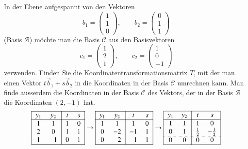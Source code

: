 \begin{beispiel}
In der Ebene aufgespannt von den Vektoren
\[
b_1=\begin{pmatrix}1\\1\\0 \end{pmatrix}
,\qquad
b_2=\begin{pmatrix}0\\1\\1 \end{pmatrix}
\]
(Basis $\mathcal{B}$)
möchte man die Basis $\mathcal{C}$ aus den Basisvektoren
\[
c_1=\begin{pmatrix}1\\2\\1\end{pmatrix}
,\qquad
c_2=\begin{pmatrix}1\\0\\-1\end{pmatrix}
\]
verwenden.
Finden Sie die Koordinatentransformationsmatrix $T$, mit der
man einen Vektor $t\vec{b}_1+s\vec{b}_2$
in die Koordinaten in
der Basis $\mathcal{C}$ umrechnen kann.
Man finde ausserdem die
Koordinaten in der Basis $\mathcal{C}$ des Vektors, der in der Basis
$\mathcal{B}$ die Koordinaten $(2,-1)$ hat.
\begin{align*}
\begin{tabular}{|>{$}c<{$}>{$}c<{$}|>{$}c<{$}>{$}c<{$}|}
\hline
y_1&y_2&t&s\\
\hline
1& 1&1&0\\
2& 0&1&1\\
1&-1&0&1\\
\hline
\end{tabular}
&\rightarrow
\begin{tabular}{|>{$}c<{$}>{$}c<{$}|>{$}c<{$}>{$}c<{$}|}
\hline
y_1&y_2&t&s\\
\hline
1& 1& 1&0\\
0&-2&-1&1\\
0&-2&-1&1\\
\hline
\end{tabular}
\rightarrow
\begin{tabular}{|>{$}c<{$}>{$}c<{$}|>{$}c<{$}>{$}c<{$}|}
\hline
y_1&y_2&t&s\\
\hline
1& 1&      1&       0\\
0& 1&\frac12&-\frac12\\
\hdashline
0& 0&      0&       0\\
\hline
\end{tabular}
\\

\end{align*}
\end{beispiel}
